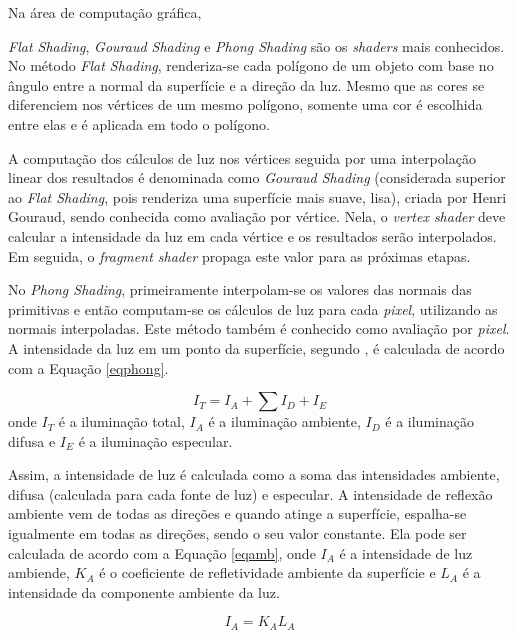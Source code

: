	Na área de computação gráfica, {\textit{Flat Shading}, \textit{Gouraud Shading} e \textit{Phong Shading} são os \textit{shaders} mais conhecidos. No método \textit{Flat Shading}, renderiza-se cada polígono de um objeto com base no ângulo entre a normal da superfície e a direção da luz. Mesmo que as cores se diferenciem nos vértices de um mesmo polígono, somente uma cor é escolhida entre elas e é aplicada em todo o polígono.  

	A computação dos cálculos de luz nos  vértices seguida por uma interpolação linear dos resultados é denominada como \textit{Gouraud Shading} (considerada superior ao \textit{Flat Shading}, pois renderiza uma superfície mais suave, lisa), criada por Henri Gouraud, sendo conhecida como avaliação por vértice. Nela, o \textit{vertex shader} deve calcular a intensidade da luz em cada vértice e os resultados serão interpolados. Em seguida, o \textit{fragment shader} propaga este valor para as próximas etapas. 

	No \textit{Phong Shading}, primeiramente interpolam-se os valores das normais das primitivas e então computam-se os cálculos de luz para cada \textit{pixel}, utilizando as normais interpoladas. Este método também é conhecido como avaliação por \textit{pixel}. A intensidade da luz em um ponto da superfície, segundo \cite{guha2011}, é calculada de acordo com a Equação \ref{eqphong}.  

	\begin{equation}
	I_ {T} = I_ {A} +  \sum I_ {D} + I_ {E}
	\label{eqphong}
	\end{equation}
	onde $I_{T}$ é a iluminação total, $I_A$ é a iluminação ambiente, $I_D$ é a iluminação difusa e $I_E$ é a iluminação especular. 

	Assim, a intensidade de luz é calculada como a soma das intensidades ambiente, difusa (calculada para cada fonte de luz) e especular.  A intensidade de reflexão ambiente vem de todas as direções e quando atinge a superfície, espalha-se igualmente em todas as direções, sendo o seu valor constante. Ela pode ser calculada de acordo com a Equação \ref{eqamb}, onde $I_A$ é a intensidade de luz ambiende, $K_ {A}$ é o coeficiente de refletividade ambiente da superfície e $L_ {A}$ é a intensidade da componente ambiente da luz.

	\begin{equation}
		I_ {A} = K_ {A}L_ {A} 
	\label{eqamb}
	\end{equation}

}
